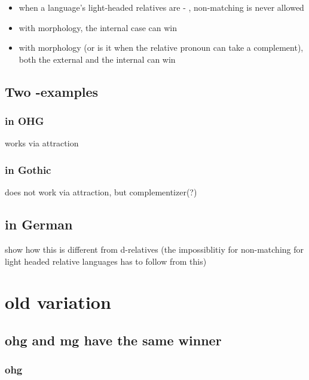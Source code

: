 \begin{itemize}
  \item when a language's light-headed relatives are  - , non-matching is never allowed
  \item with  morphology, the internal case can win
  \item with  morphology (or is it when the relative pronoun can take a complement), both the external and the internal can win
\end{itemize}


\section{Two -examples}

\subsection{ in OHG}

works via attraction

\subsection{ in Gothic}

does not work via attraction, but complementizer(?)

\section{ in German}

show how this is different from d-relatives (the impossiblitiy for non-matching for   light headed relative languages has to follow from this)








\chapter*{old variation}

\section{\ac{ohg} and \ac{mg} have the same winner}


\subsection{\ac{ohg}}

